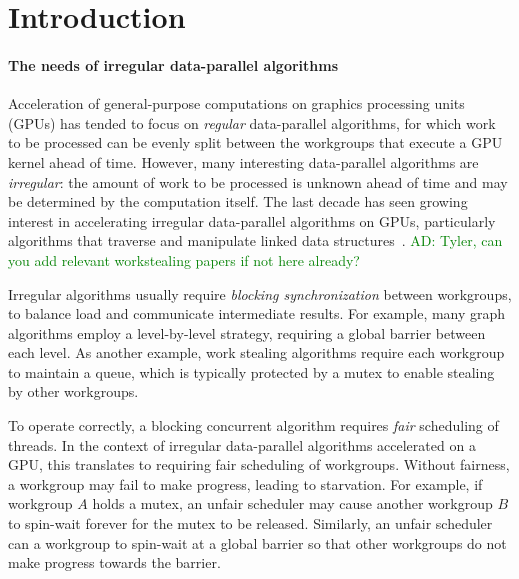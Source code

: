 \documentclass[numbers,nocopyrightspace,10pt]{sigplanconf}
\newcommand{\ADComment}[1]{\textcolor{green}{AD: #1}}
\begin{document}
\section{Introduction}\label{sec:intro}

\paragraph{The needs of irregular data-parallel algorithms}
Acceleration of general-purpose computations on graphics processing
units (GPUs) has tended to focus on \emph{regular} data-parallel
algorithms, for which work to be processed can be evenly split between
the workgroups that execute a GPU kernel ahead of time.  However, many
interesting data-parallel algorithms are \emph{irregular}: the amount
of work to be processed is unknown ahead of time and may be determined
by the computation itself.  The last decade has seen growing interest in accelerating irregular
data-parallel algorithms on GPUs, particularly algorithms that
traverse and manipulate linked data structures~\cite{owens-persistent,TPO10,DBLP:conf/ipps/KaleemVPHP16,DBLP:conf/ipps/DavidsonBGO14,DBLP:conf/hipc/HarishN07,DBLP:journals/topc/MerrillGG15,DBLP:conf/egh/VineetHPN09,DBLP:conf/ppopp/NobariCKB12,DBLP:conf/hpcc/SolomonTT10a,DBLP:conf/popl/PrabhuRMH11,DBLP:conf/ppopp/Mendez-LojoBP12,DBLP:conf/oopsla/PaiP16,DBLP:conf/ipps/KaleemVPHP16,DBLP:conf/oopsla/SorensenDBGR16}.  \ADComment{Tyler, can you add relevant workstealing papers if not here already?}

Irregular algorithms usually require \emph{blocking synchronization}
between workgroups, to balance load and communicate intermediate
results.  For example, many graph algorithms employ a level-by-level strategy, requiring a global barrier between each level.
As another example, work stealing algorithms require each workgroup
to maintain a queue, which is typically protected by a mutex to enable
stealing by other workgroups.

To operate correctly, a blocking concurrent algorithm requires
\emph{fair} scheduling of threads.  In the context of irregular
data-parallel algorithms accelerated on a GPU, this translates to
requiring fair scheduling of workgroups.  Without fairness, a
workgroup may fail to make progress, leading to starvation.  For
example, if workgroup $A$ holds a mutex, an unfair scheduler may cause
another workgroup $B$ to spin-wait forever for the mutex to be
released.  Similarly, an unfair scheduler can a workgroup to spin-wait
at a global barrier so that other workgroups do not make progress
towards the barrier.
\end{document}
